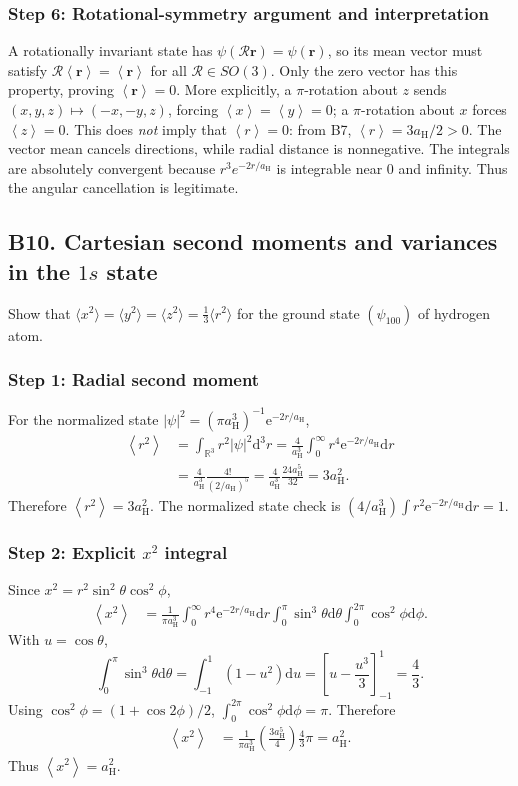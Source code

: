 \documentclass[11pt,a4paper]{article}
\newcommand{\dd}{\mathrm{d}}
\newcommand{\ee}{\mathrm{e}}
\newcommand{\avg}[1]{\left\langle #1\right\rangle}
\newcommand{\R}{\mathbb R}
\newcommand{\aH}{a_{\mathrm H}}
\begin{document}
\subsubsection*{Step 6: Rotational-symmetry argument and interpretation}
A rotationally invariant state has \(\psi(\mathcal R\mathbf r)=\psi(\mathbf r)\), so its mean vector must satisfy \(\mathcal R\avg{\mathbf r}=\avg{\mathbf r}\) for all \(\mathcal R\in SO(3)\). Only the zero vector has this property, proving \(\avg{\mathbf r}=0\). More explicitly, a \(\pi\)-rotation about \(z\) sends \((x,y,z)\mapsto(-x,-y,z)\), forcing \(\avg x=\avg y=0\); a \(\pi\)-rotation about \(x\) forces \(\avg z=0\).
This does \emph{not} imply that \(\avg r=0\): from B7, \(\avg r=3\aH/2>0\). The vector mean cancels directions, while radial distance is nonnegative. The integrals are absolutely convergent because \(r^3e^{-2r/\aH}\) is integrable near \(0\) and infinity. Thus the angular cancellation is legitimate.

\subsection{B10. Cartesian second moments and variances in the \texorpdfstring{$1s$}{1s} state}
\begin{questionbox}Show that \(\langle x^2\rangle=\langle y^2\rangle=\langle z^2\rangle=\tfrac13\langle r^2\rangle\) for the ground state \((\psi_{100})\) of hydrogen atom.\end{questionbox}
\subsubsection*{Step 1: Radial second moment}
For the normalized state \(|\psi|^2=(\pi\aH^3)^{-1}\ee^{-2r/\aH}\),
\begin{align}
\avg{r^2}&=\int_{\R^3}r^2|\psi|^2\dd^3r=\frac4{\aH^3}\int_0^\infty r^4\ee^{-2r/\aH}\dd r\\
&=\frac4{\aH^3}\frac{4!}{(2/\aH)^5}=\frac4{\aH^3}\frac{24\aH^5}{32}=3\aH^2.
\end{align}
Therefore \(\boxed{\avg{r^2}=3\aH^2}\). The normalized state check is \((4/\aH^3)\int r^2\ee^{-2r/\aH}\dd r=1\).

\subsubsection*{Step 2: Explicit \texorpdfstring{$x^2$}{x2} integral}
Since \(x^2=r^2\sin^2\theta\cos^2\phi\),
\begin{align}
\avg{x^2}&=\frac1{\pi\aH^3}\int_0^\infty r^4\ee^{-2r/\aH}\dd r\int_0^\pi\sin^3\theta\dd\theta\int_0^{2\pi}\cos^2\phi\dd\phi.
\end{align}
With \(u=\cos\theta\),
\begin{equation}\int_0^\pi\sin^3\theta\dd\theta=\int_{-1}^1(1-u^2)\dd u=\left[u-\frac{u^3}{3}\right]_{-1}^1=\frac43.\end{equation}
Using \(\cos^2\phi=(1+\cos2\phi)/2\), \(\int_0^{2\pi}\cos^2\phi\dd\phi=\pi\). Therefore
\begin{align}
\avg{x^2}&=\frac1{\pi\aH^3}\left(\frac{3\aH^5}{4}\right)\frac43\pi=\aH^2.
\end{align}
Thus \(\boxed{\avg{x^2}=\aH^2}\).
\end{document}

